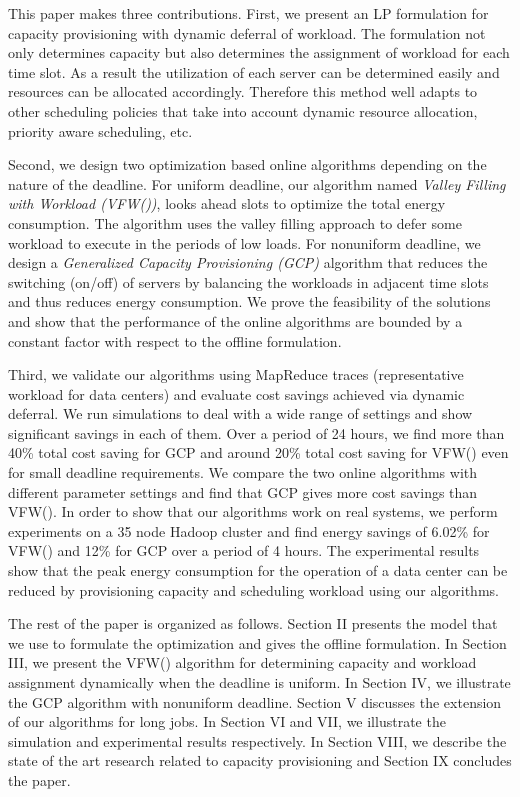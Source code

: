 \documentclass[10pt,conference,compsocconf,letterpaper]{IEEEtran}
\begin{document}
This paper makes three contributions. First, we present an LP formulation for capacity provisioning with dynamic deferral of workload. The formulation not only determines capacity but also determines the assignment of workload for each time slot. As a result the utilization of each server can be determined easily and resources can be allocated accordingly. Therefore this method well adapts to other scheduling policies that take into account dynamic resource allocation, priority aware scheduling, etc.

Second, we design two optimization based online algorithms depending on the nature of the deadline. For uniform deadline, our algorithm named {\it Valley Filling with Workload (VFW())}, looks ahead  slots to optimize the total energy consumption. The algorithm uses the valley filling approach to defer some workload to execute in the periods of low loads. For nonuniform deadline, we design a {\it Generalized Capacity Provisioning (GCP)} algorithm that reduces the switching (on/off) of servers by balancing the workloads in adjacent time slots and thus reduces energy consumption.  We prove the feasibility of the solutions and show that the performance of the online algorithms are bounded by a constant factor with respect to the offline formulation.

Third, we validate our algorithms using MapReduce traces (representative workload for data centers) and evaluate cost savings achieved via dynamic deferral. We run simulations to deal with a wide range of settings and show significant savings in each of them. Over a period of 24 hours, we find more than 40\% total cost saving for GCP and around 20\% total cost saving for VFW() even for small deadline requirements. We compare the two online algorithms with different parameter settings and find that GCP gives more cost savings than VFW(). In order to show that our algorithms work on real systems, we perform experiments on a 35 node Hadoop cluster and find energy savings of 6.02\% for VFW() and 12\% for GCP over a period of 4 hours. The experimental results show that the peak energy consumption for the operation of a data center can be reduced by provisioning capacity and scheduling workload using our algorithms.








The rest of the paper is organized as follows. Section II presents the model that we use to formulate the optimization and gives the offline formulation. In Section III, we present the VFW() algorithm for determining capacity and workload assignment dynamically when the deadline is uniform. In Section IV, we illustrate the GCP algorithm with nonuniform deadline. Section V discusses the extension of our algorithms for long jobs. In Section VI and VII, we illustrate the simulation and experimental results respectively. In Section VIII, we describe the state of the art research related to capacity provisioning and Section IX concludes the paper.
\end{document}
